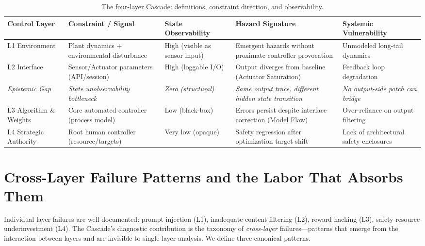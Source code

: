 \documentclass[11pt]{article}
\begin{document}
\begin{table}[!htbp]
\centering
\small
\caption{The four-layer Cascade: definitions, constraint direction, and observability.}
\label{tab:layers}
{\setlength{\tabcolsep}{4pt}
\begin{tabularx}{\columnwidth}{@{}l l Y Y Y@{}}
\toprule
\textbf{Control Layer} & \textbf{Constraint / Signal} & \textbf{State Observability} & \textbf{Hazard Signature} & \textbf{Systemic Vulnerability} \\
\midrule
L1 Environment & Plant dynamics + environmental disturbance & High (visible as sensor input) & Emergent hazards without proximate controller provocation & Unmodeled long-tail dynamics \\
L2 Interface & Sensor/Actuator parameters (API/session) & High (loggable I/O) & Output diverges from baseline (Actuator Saturation) & Feedback loop degradation \\
\textit{Epistemic Gap} & \textit{State unobservability bottleneck} & \textit{Zero (structural)} & \textit{Same output trace, different hidden state transition} & \textit{No output-side patch can bridge} \\
L3 Algorithm \& Weights & Core automated controller (process model) & Low (black-box) & Errors persist despite interface correction (Model Flaw) & Over-reliance on output filtering \\
L4 Strategic Authority & Root human controller (resource/targets) & Very low (opaque) & Safety regression after optimization target shift & Lack of architectural safety enclosures \\
\bottomrule
\end{tabularx}}
\end{table}


\section{Cross-Layer Failure Patterns and the Labor That Absorbs Them}\label{sec:patterns}

Individual layer failures are well-documented: prompt injection (L1), inadequate content filtering (L2), reward hacking (L3), safety-resource underinvestment (L4). The Cascade's diagnostic contribution is the taxonomy of \textit{cross-layer} failures---patterns that emerge from the interaction between layers and are invisible to single-layer analysis. We define three canonical patterns.
\end{document}
